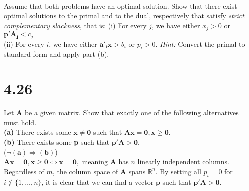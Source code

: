 \documentclass{article}
\begin{document}
\begin{Parallel}[v]{0.5\textwidth}{0.2\textwidth}
\ParallelPar
\end{Parallel}


\noindent \\
Assume that both problems have an optimal solution.  Show that there exist optimal solutions to the primal and to the dual, respectively that satisfy \emph{strict complementary slackness}, that is:
(i) For every $j$, we have either $x_j > 0$ or $\mathbf{p'A_j} < c_j$ \\
(ii) For every $i$, we have either $\mathbf{a'_i x} > b_i$ or $p_i > 0$.  \emph{Hint:} Convert the primal to standard form and apply part (b). \\

\section*{4.26} 
Let $\mathbf{A}$ be a given matrix.  Show that exactly one of the following alternatives must hold.\\

\noindent
\textbf{(a)} There exists some $\mathbf{x \neq 0}$ such that $\mathbf{Ax = 0, x \geq 0}$.\\
\textbf{(b)} There exists some \textbf{p} such that $\mathbf{p'A > 0}$. \\

\noindent
($\mathbf{\neg (a) \Rightarrow (b)}$) \\
\noindent
$\mathbf{Ax = 0, x \geq 0} \Leftrightarrow \mathbf{x = 0},$  meaning $\mathbf{A}$ has $n$ linearly independent columns.  Regardless of $m$, the column space of $\mathbf{A}$ spans $\mathbb{R}^n$.  By setting all $p_i = 0$ for $i \notin \{1, \dots, n\}$, it is clear that we can find a vector $\mathbf{p}$ such that $\mathbf{p'A > 0}$. \\
\end{document}
